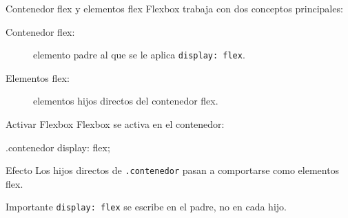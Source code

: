 \documentclass[aspectratio=169,11.5pt]{beamer}
\begin{document}
    \begin{frame}{Contenedor flex y elementos flex}
        Flexbox trabaja con dos conceptos principales:

        \begin{description}
            \item[Contenedor flex:]
            elemento padre al que se le aplica
            \texttt{display: flex}.

            \item[Elementos flex:]
            elementos hijos directos del contenedor flex.
        \end{description}

        \begin{center}
        \end{center}
    \end{frame}

    \begin{frame}[fragile]{Activar Flexbox}
        Flexbox se activa en el contenedor:

        \begin{csscodedark}
            .contenedor {
                display: flex;
            }
        \end{csscodedark}

        \begin{block}{Efecto}
            Los hijos directos de \texttt{.contenedor}
            pasan a comportarse como elementos flex.
        \end{block}

        \begin{alertblock}{Importante}
            \texttt{display: flex} se escribe en el padre,
            no en cada hijo.
        \end{alertblock}
    \end{frame}
\end{document}
